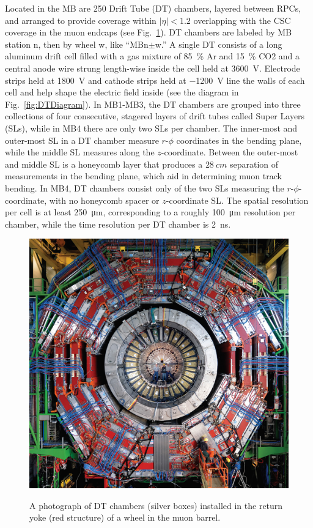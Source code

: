 

Located in the MB are 250 Drift Tube (DT) chambers, layered between RPCs, and arranged to provide coverage within $|\eta|<1.2$ overlapping with the CSC coverage in the muon endcaps (see Fig.~\ref{fig:DT}). DT chambers are labeled by MB station n, then by wheel w, like ``MBn$\pm$w.'' A single DT consists of a long aluminum drift cell filled with a gas mixture of 85~\% Ar and 15~\% CO2 and a central anode wire strung length-wise inside the cell held at \SI{+3600}{V}. Electrode strips held at \SI{+1800}{V} and cathode strips held at \SI{-1200}{V} line the walls of each cell and help shape the electric field inside (see the diagram in Fig.~\ref{fig:DTDiagram}). In MB1-MB3, the DT chambers are grouped into three collections of four consecutive, stagered layers of drift tubes called Super Layers (SLs), while in MB4 there are only two SLs per chamber. The inner-most and outer-most SL in a DT chamber measure $r$-$\phi$ coordinates in the bending plane, while the middle SL measures along the $z$-coordinate. Between the outer-most and middle SL is a honeycomb layer that produces a $\SI{28}{cm}$ separation of measurements in the bending plane, which aid in determining muon track bending. In MB4, DT chambers consist only of the two SLs measuring the $r$-$\phi$-coordinate, with no honeycomb spacer or $z$-coordinate SL. The spatial resolution per cell is at least \SI{250}{\micro\meter}, corresponding to a roughly \SI{100}{\micro\meter} resolution per chamber, while the time resolution per DT chamber is \SI{2}{ns}.

\begin{figure}[H]
    \centering
   { \includegraphics[width=\textwidth]{Images/CMS/DT.jpg}}
    \caption{A photograph of DT chambers (silver boxes) installed in the return yoke (red structure) of a wheel in the muon barrel.}
    \label{fig:DT}
\end{figure}

